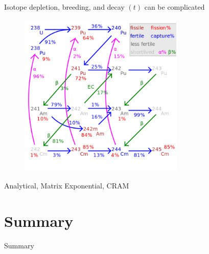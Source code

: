 \documentclass{beamer}
\begin{document}
        \begin{frame}{Isotope depletion, breeding, and decay $(t)$ can be complicated}
            \begin{figure}
                \centering
                \includegraphics[width=0.7\textwidth]{./img/fuelCycle.png}
                \caption*{}
            \end{figure}
        \end{frame}

        \begin{frame}{Analytical, Matrix Exponential, CRAM}
        \end{frame}

\section*{Summary}

    \begin{frame}{Summary}
    \end{frame}
\end{document}
